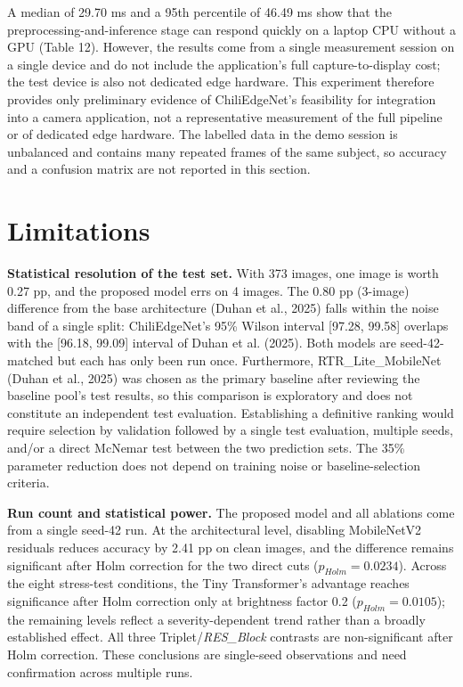 A median of 29.70 ms and a 95th percentile of 46.49 ms show that the preprocessing-and-inference stage can respond quickly on a laptop CPU without a GPU (Table 12). However, the results come from a single measurement session on a single device and do not include the application's full capture-to-display cost; the test device is also not dedicated edge hardware. This experiment therefore provides only preliminary evidence of ChiliEdgeNet's feasibility for integration into a camera application, not a representative measurement of the full pipeline or of dedicated edge hardware. The labelled data in the demo session is unbalanced and contains many repeated frames of the same subject, so accuracy and a confusion matrix are not reported in this section.

\FloatBarrier

\section{Limitations}\label{limitations}

\textbf{Statistical resolution of the test set.} With 373 images, one image is worth 0.27 pp, and the proposed model errs on 4 images. The 0.80 pp (3-image) difference from the base architecture (Duhan et al., 2025) falls within the noise band of a single split: ChiliEdgeNet's 95\% Wilson interval {[}97.28, 99.58{]} overlaps with the {[}96.18, 99.09{]} interval of Duhan et al. (2025). Both models are seed-42-matched but each has only been run once. Furthermore, RTR\_Lite\_MobileNet (Duhan et al., 2025) was chosen as the primary baseline after reviewing the baseline pool's test results, so this comparison is exploratory and does not constitute an independent test evaluation. Establishing a definitive ranking would require selection by validation followed by a single test evaluation, multiple seeds, and/or a direct McNemar test between the two prediction sets. The 35\% parameter reduction does not depend on training noise or baseline-selection criteria.

\textbf{Run count and statistical power.} The proposed model and all ablations come from a single seed-42 run. At the architectural level, disabling MobileNetV2 residuals reduces accuracy by 2.41 pp on clean images, and the difference remains significant after Holm correction for the two direct cuts ($p_{Holm} = 0.0234$). Across the eight stress-test conditions, the Tiny Transformer's advantage reaches significance after Holm correction only at brightness factor 0.2 ($p_{Holm} = 0.0105$); the remaining levels reflect a severity-dependent trend rather than a broadly established effect. All three Triplet/\emph{RES\_Block} contrasts are non-significant after Holm correction. These conclusions are single-seed observations and need confirmation across multiple runs.

